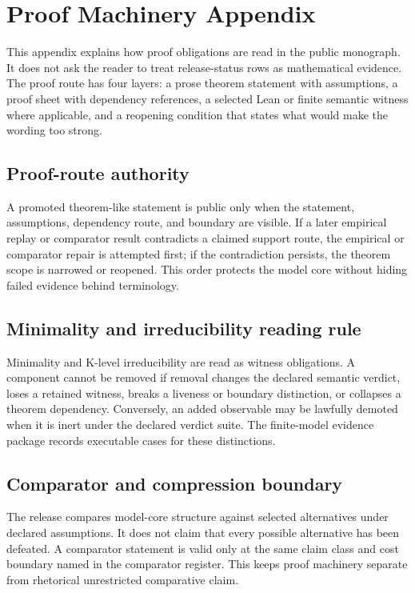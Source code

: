 \section{Proof Machinery Appendix}

\label{sec:oc13-proof-machinery-appendix}

This appendix explains how proof obligations are read in the public monograph. It does not ask the reader to treat release-status rows as mathematical evidence. The proof route has four layers: a prose theorem statement with assumptions, a proof sheet with dependency references, a selected Lean or finite semantic witness where applicable, and a reopening condition that states what would make the wording too strong.


\subsection{Proof-route authority}

A promoted theorem-like statement is public only when the statement, assumptions, dependency route, and boundary are visible. If a later empirical replay or comparator result contradicts a claimed support route, the empirical or comparator repair is attempted first; if the contradiction persists, the theorem scope is narrowed or reopened. This order protects the model core without hiding failed evidence behind terminology.


\subsection{Minimality and irreducibility reading rule}

Minimality and K-level irreducibility are read as witness obligations. A component cannot be removed if removal changes the declared semantic verdict, loses a retained witness, breaks a liveness or boundary distinction, or collapses a theorem dependency. Conversely, an added observable may be lawfully demoted when it is inert under the declared verdict suite. The finite-model evidence package records executable cases for these distinctions.


\subsection{Comparator and compression boundary}

The release compares model-core structure against selected alternatives under declared assumptions. It does not claim that every possible alternative has been defeated. A comparator statement is valid only at the same claim class and cost boundary named in the comparator register. This keeps proof machinery separate from rhetorical unrestricted comparative claim.


